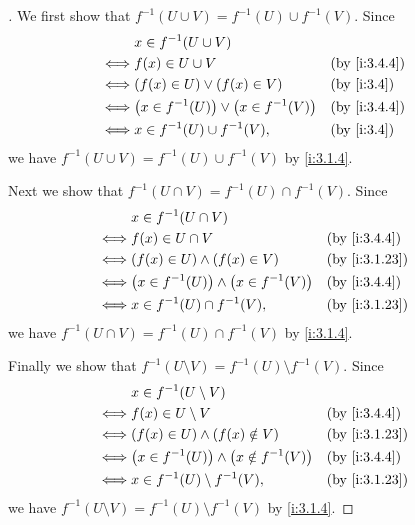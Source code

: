 \begin{proof}[]
  We first show that \(f^{-1}(U \cup V) = f^{-1}(U) \cup f^{-1}(V)\).
  Since
  \begin{align*}
         & x \in f^{-1}(U \cup V)                                           \\
    \iff & f(x) \in U \cup V                              &  & \by{i:3.4.4} \\
    \iff & (f(x) \in U) \lor (f(x) \in V)                 &  & \by{i:3.4}   \\
    \iff & \pa{x \in f^{-1}(U)} \lor \pa{x \in f^{-1}(V)} &  & \by{i:3.4.4} \\
    \iff & x \in f^{-1}(U) \cup f^{-1}(V),                &  & \by{i:3.4}
  \end{align*}
  we have \(f^{-1}(U \cup V) = f^{-1}(U) \cup f^{-1}(V)\) by \cref{i:3.1.4}.

  Next we show that \(f^{-1}(U \cap V) = f^{-1}(U) \cap f^{-1}(V)\).
  Since
  \begin{align*}
         & x \in f^{-1}(U \cap V)                                             \\
    \iff & f(x) \in U \cap V                               &  & \by{i:3.4.4}  \\
    \iff & (f(x) \in U) \land (f(x) \in V)                 &  & \by{i:3.1.23} \\
    \iff & \pa{x \in f^{-1}(U)} \land \pa{x \in f^{-1}(V)} &  & \by{i:3.4.4}  \\
    \iff & x \in f^{-1}(U) \cap f^{-1}(V),                 &  & \by{i:3.1.23}
  \end{align*}
  we have \(f^{-1}(U \cap V) = f^{-1}(U) \cap f^{-1}(V)\) by \cref{i:3.1.4}.

  Finally we show that \(f^{-1}(U \setminus V) = f^{-1}(U) \setminus f^{-1}(V)\).
  Since
  \begin{align*}
         & x \in f^{-1}(U \setminus V)                                           \\
    \iff & f(x) \in U \setminus V                             &  & \by{i:3.4.4}  \\
    \iff & (f(x) \in U) \land (f(x) \notin V)                 &  & \by{i:3.1.23} \\
    \iff & \pa{x \in f^{-1}(U)} \land \pa{x \notin f^{-1}(V)} &  & \by{i:3.4.4}  \\
    \iff & x \in f^{-1}(U) \setminus f^{-1}(V),               &  & \by{i:3.1.23}
  \end{align*}
  we have \(f^{-1}(U \setminus V) = f^{-1}(U) \setminus f^{-1}(V)\) by \cref{i:3.1.4}.
\end{proof}


